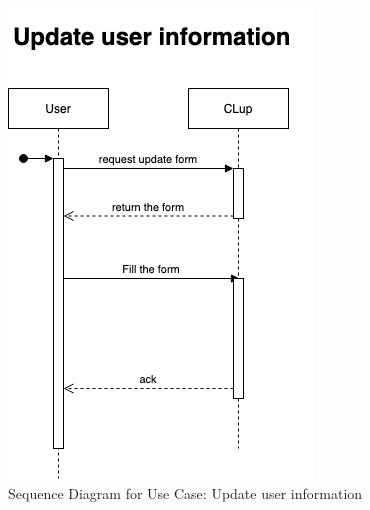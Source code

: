 \begin{figure}[H]
    \centering
    \includegraphics[height=0.5\textwidth]{Images/SequenceDiagrams/UpdateUserInformationUseCaseSequenceDiagram.png}
    \caption{Sequence Diagram for Use Case: Update user information}
\end{figure}


